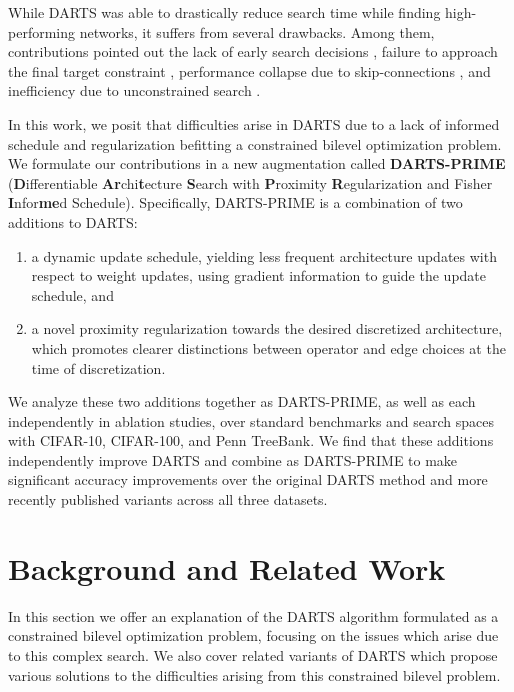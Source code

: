 \documentclass[letterpaper]{article} \usepackage{aaai22}  \usepackage{times}  \usepackage{helvet}  \usepackage{courier}  \usepackage[hyphens]{url}  \usepackage{graphicx} \urlstyle{rm} \def\UrlFont{\rm}  \usepackage{natbib}  \usepackage{caption} \DeclareCaptionStyle{ruled}{labelfont=normalfont,labelsep=colon,strut=off} \frenchspacing  \setlength{\pdfpagewidth}{8.5in}  \setlength{\pdfpageheight}{11in}  \usepackage{algorithm}
\begin{document}
While DARTS was able to drastically reduce search time while finding high-performing networks, it suffers from several drawbacks. Among them, contributions pointed out the lack of early search decisions \cite{li2020pd,chen2019progressive, wang2020rethinking}, failure to approach the final target constraint \cite{chu2020fair}, performance collapse due to skip-connections \cite{chu2020darts,zhou2020theory,zela2020understanding}, and inefficiency due to unconstrained search \cite{yao2020efficient}. 

In this work, we posit that difficulties arise in DARTS due to a lack of informed schedule and regularization befitting a constrained bilevel optimization problem. We formulate our contributions in a new augmentation called \textbf{DARTS-PRIME} (\textbf{D}ifferentiable \textbf{Ar}chi\textbf{t}ecture \textbf{S}earch with \textbf{P}roximity \textbf{R}egularization and Fisher \textbf{I}nfor\textbf{me}d Schedule). Specifically, DARTS-PRIME is a combination of two additions to DARTS:
\begin{enumerate}
\item a dynamic update schedule, yielding less frequent architecture updates with respect to weight updates, using gradient information to guide the update schedule, and
\item a novel proximity regularization towards the desired discretized architecture, which promotes clearer distinctions between operator and edge choices at the time of discretization.
\end{enumerate}

We analyze these two additions together as DARTS-PRIME, as well as each independently in ablation studies, over standard benchmarks and search spaces with CIFAR-10, CIFAR-100, and Penn TreeBank. We find that these additions independently improve DARTS and combine as DARTS-PRIME to make significant accuracy improvements over the original DARTS method and more recently published variants across all three datasets.

\section{Background and Related Work}

In this section we offer an explanation of the DARTS algorithm formulated as a constrained bilevel optimization problem, focusing on the issues which arise due to this complex search. We also cover related variants of DARTS which propose various solutions to the difficulties arising from this constrained bilevel problem.
\end{document}
